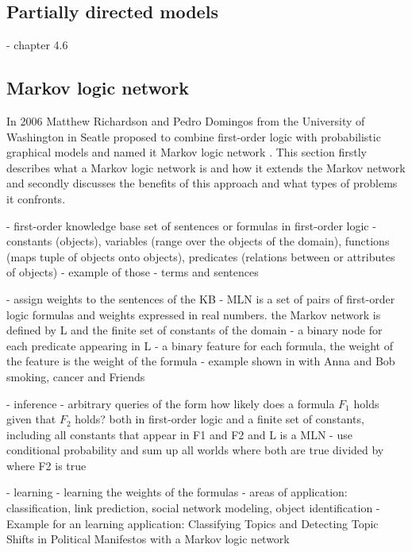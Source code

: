 \subsection{Partially directed models}
- chapter 4.6


\subsection{Markov logic network} \label{sec:mln}

In 2006 Matthew Richardson and Pedro Domingos from the University of Washington in Seatle proposed to combine first-order logic with probabilistic graphical models and named it Markov logic network \cite{richardson2006markov}. This section firstly describes what a Markov logic network is and how it extends the Markov network and secondly discusses the benefits of this approach and what types of problems it confronts.

- first-order knowledge base set of sentences or formulas in first-order logic
- constants (objects), variables (range over the objects of the domain), functions (maps tuple of objects onto objects), predicates (relations between or attributes of objects)
- example of those
- terms and sentences

- assign weights to the sentences of the KB
- MLN is a set of pairs of first-order logic formulas and weights expressed in real numbers. the Markov network is defined by L and the finite set of constants of the domain 
 - a binary node for each predicate appearing in L
 - a binary feature for each formula, the weight of the feature is the weight of the formula
- example shown in \cite{richardson2006markov} with Anna and Bob smoking, cancer and Friends %

- inference
 - arbitrary queries of the form how likely does a formula $F_1$ holds given that $F_2$ holds? both in first-order logic and a finite set of constants, including all constants that appear in F1 and F2 \cite{richardson2006markov} and L is a MLN
  - use conditional probability and sum up all worlds where both are true divided by where F2 is true
  
- learning
 - learning the weights of the formulas
 - areas of application: classification, link prediction, social network modeling, object identification
 - Example for an learning application: Classifying Topics and Detecting Topic Shifts in Political Manifestos with a Markov logic network \cite{zirn2016classifying}


